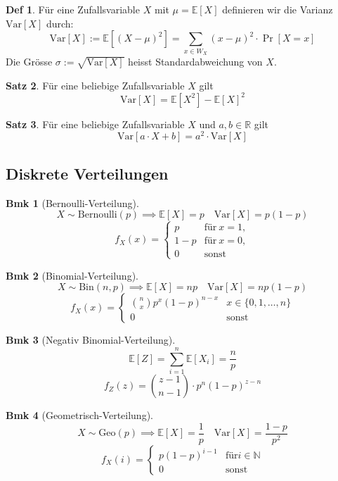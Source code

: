 \documentclass[a4paper, 10pt]{article}
\theoremstyle{definition}
\newtheorem{definition}{Def}[section]
\newtheorem{theorem}[definition]{Satz}
\newtheorem*{note}{Bmk}
\theoremstyle{named}
\newcommand{\R}{\mathbb{R}}
\newcommand{\N}{\mathbb{N}}
\newcommand{\E}{\mathbb{E}}
\newcommand{\Var}{\text{Var}}
\begin{document}
\setcounter{definition}{38}
\begin{definition}
    Für eine Zufallsvariable $X$ mit $\mu = \E[X]$ definieren wir die Varianz $\Var[X]$ durch:
    $$\Var[X] := \E[(X - \mu)^2] = \sum_{x \in W_X} (x - \mu)^2 \cdot \Pr[X = x]$$
    Die Grösse $\sigma := \sqrt{\Var[X]}$ heisst Standardabweichung von $X$.
\end{definition}

\begin{theorem}
    Für eine beliebige Zufallsvariable $X$ gilt 
    $$\Var[X] = \E[X^2] - \E[X]^2$$
\end{theorem}

\begin{theorem}
    Für eine beliebige Zufallsvariable $X$ und $a, b \in \R$ gilt
    $$\Var[a \cdot X + b] = a^2 \cdot \Var[X]$$
\end{theorem}

\subsection{Diskrete Verteilungen}
\begin{note}[Bernoulli-Verteilung]
    $$X \sim \text{Bernoulli}(p) \implies \E[X] = p \quad \Var[X] = p(1 - p)$$
    $$f_X(x) = \begin{cases}
        p & \text{für} \ x = 1, \\
        1 - p & \text{für} \ x = 0, \\
        0 & \text{sonst}
    \end{cases}$$
\end{note}

\begin{note}[Binomial-Verteilung]
    $$X \sim \text{Bin}(n, p) \implies \E[X] = np \quad \Var[X] = np(1 - p)$$
    $$f_X(x) = \begin{cases}
        \binom{n}{x}p^x(1-p)^{n - x} & x \in \{0, 1, \ldots, n\} \\
        0 & \text{sonst}
    \end{cases}$$
\end{note}

\begin{note}[Negativ Binomial-Verteilung]
    $$\E[Z] = \sum_{i = 1}^n \E[X_i] = \frac{n}{p}$$
    $$f_Z(z) = \binom{z - 1}{n - 1}\cdot p^n(1 - p)^{z - n}$$
\end{note}

\begin{note}[Geometrisch-Verteilung]
    $$X \sim \text{Geo}(p) \implies \E[X] = \frac{1}{p} \quad \Var[X] = \frac{1 - p}{p^2}$$
    $$f_X(i) = \begin{cases}
        p(1-p)^{i - 1} & \text{für} i \in \N \\
        0 & \text{sonst}
    \end{cases}$$
\end{note}
\end{document}
